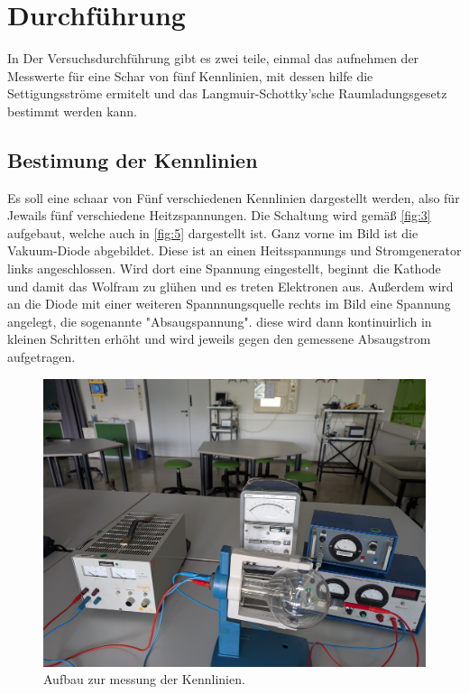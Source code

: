 \section{Durchführung}
\label{sec:Durchführung}
In Der Versuchsdurchführung gibt es zwei teile, einmal das aufnehmen der Messwerte für eine Schar von fünf Kennlinien, 
mit dessen hilfe die Settigungsströme ermitelt und das Langmuir-Schottky’sche Raumladungsgesetz bestimmt werden kann.
\subsection{Bestimung der Kennlinien}
\label{sec:1}
Es soll eine schaar von Fünf verschiedenen Kennlinien dargestellt werden, also für Jewails fünf verschiedene 
Heitzspannungen. Die Schaltung wird gemäß \autoref{fig:3} aufgebaut, welche auch in \autoref{fig:5} dargestellt ist.
Ganz vorne im Bild ist die Vakuum-Diode abgebildet. Diese ist an einen Heitsspannungs und Stromgenerator links angeschlossen.
Wird dort eine Spannung eingestellt, beginnt die Kathode und damit das Wolfram zu glühen und es treten Elektronen aus.
 Außerdem wird 
an die Diode mit einer weiteren Spannnungsquelle rechts im Bild eine Spannung angelegt, die sogenannte "Absaugspannung". diese wird 
dann kontinuirlich in kleinen Schritten erhöht und wird jeweils gegen den gemessene Absaugstrom aufgetragen.
\begin{figure}[H]
    \centering
        \centering
        \includegraphics[width=\textwidth]{Bilder/2.jpg}
        \caption{Aufbau zur messung der Kennlinien.}
    \hfill
    \label{fig:4}
\end{figure}

